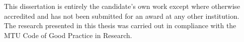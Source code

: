 
\begin{declaration}

This dissertation is entirely the candidate's own work except where otherwise accredited and has not been submitted for an award at any other institution. \\

\noindent
The research presented in this thesis was carried out in compliance with the MTU Code of Good Practice in Research. 






\end{declaration}